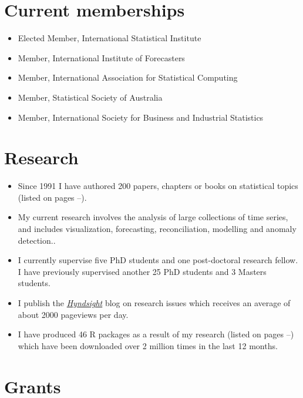 \documentclass[10pt,a4paper,]{article}
\providecommand{\tightlist}{%
  \setlength{\itemsep}{0pt}\setlength{\parskip}{0pt}}
\newcounter{papers}
\begin{document}
\hypertarget{current-memberships}{%
\section{Current memberships}\label{current-memberships}}

\begin{itemize}
\tightlist
\item
  Elected Member, International Statistical Institute
\item
  Member, International Institute of Forecasters
\item
  Member, International Association for Statistical Computing
\item
  Member, Statistical Society of Australia
\item
  Member, International Society for Business and Industrial Statistics
\end{itemize}

\hypertarget{research}{%
\section{Research}\label{research}}

\begin{itemize}
\tightlist
\item
  Since 1991 I have authored 200 papers, chapters or books on statistical topics (listed on pages \pageref{papersstart}--\pageref{papersend}).
\item
  My current research involves the analysis of large collections of time series, and includes visualization, forecasting, reconciliation, modelling and anomaly detection..
\item
  I currently supervise five PhD students and one post-doctoral research fellow. I have previously supervised another 25 PhD students and 3 Masters students.
\item
  I publish the \href{https://robjhyndman.com/hyndsight}{\emph{Hyndsight}} blog on research issues which receives an average of about 2000 pageviews per day.
\item
  I have produced 46 R packages as a result of my research (listed on pages \pageref{packagestart}--\pageref{packageend}) which have been downloaded over 2 million times in the last 12 months.
\end{itemize}

\hypertarget{grants}{%
\section{Grants}\label{grants}}
\end{document}
